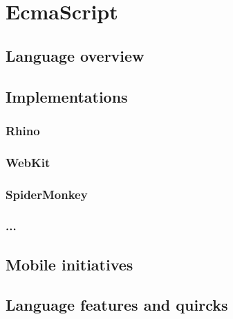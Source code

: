 \section{EcmaScript}
\subsection{Language overview}
\subsection{Implementations}
\subsubsection{Rhino}
\subsubsection{WebKit}
\subsubsection{SpiderMonkey}
\subsubsection{...}
\subsection{Mobile initiatives}
\subsection{Language features and quircks}
